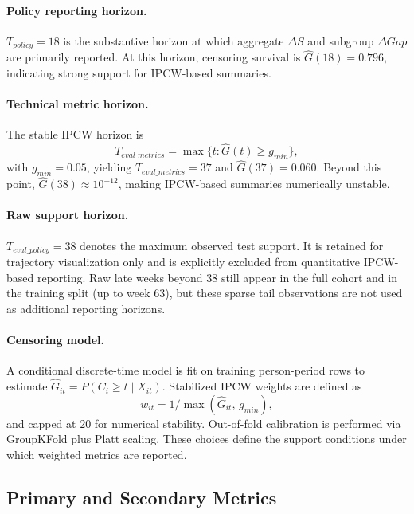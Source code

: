 \paragraph*{Policy reporting horizon.}
$T_{policy}=18$ is the substantive horizon at which aggregate $\Delta S$ and subgroup $\Delta Gap$ are primarily reported. At this horizon, censoring survival is $\hat G(18)=0.796$, indicating strong support for IPCW-based summaries.

\paragraph*{Technical metric horizon.}
The stable IPCW horizon is
\begin{equation*}
T_{eval\_metrics}=\max\{t:\hat G(t)\ge g_{min}\},
\end{equation*}
with $g_{min}=0.05$, yielding $T_{eval\_metrics}=37$ and $\hat G(37)=0.060$. Beyond this point, $\hat G(38)\approx 10^{-12}$, making IPCW-based summaries numerically unstable.

\paragraph*{Raw support horizon.}
$T_{eval\_policy}=38$ denotes the maximum observed test support. It is retained for trajectory visualization only and is explicitly excluded from quantitative IPCW-based reporting. Raw late weeks beyond 38 still appear in the full cohort and in the training split (up to week 63), but these sparse tail observations are not used as additional reporting horizons.

\paragraph*{Censoring model.}
A conditional discrete-time model is fit on training person-period rows to estimate $\hat G_{it}=P(C_i\ge t \mid X_{it})$. Stabilized IPCW weights are defined as
\[
w_{it}=1/\max(\hat G_{it},\,g_{min}),
\]
and capped at 20 for numerical stability. Out-of-fold calibration is performed via GroupKFold plus Platt scaling. These choices define the support conditions under which weighted metrics are reported.

\subsection{Primary and Secondary Metrics}
\label{subsec:metrics}

